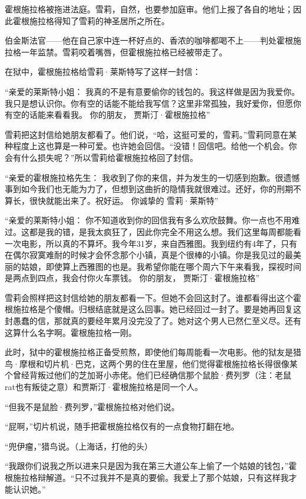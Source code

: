 霍根施拉格被拖进法庭。雪莉，自然，也要参加庭审。他们上报了各自的地址；因此霍根施拉格得知了雪莉的神圣居所之所在。

伯金斯法官——他在自己家中连一杯好点的、香浓的咖啡都喝不上——判处霍根施拉格一年监禁。雪莉咬着嘴唇，但霍根施拉格已经被带走了。

在狱中，霍根施拉格给雪莉·莱斯特写了这样一封信：

“亲爱的莱斯特小姐：
我真的不是有意要偷你的钱包的。我这样做是因为我爱你。我只是想认识你。你有空的话能不能给我写信？这里非常孤独，我好爱你，但愿你有空的话能来看看我。
你的朋友，
贾斯汀·霍根施拉格”

雪莉把这封信给她朋友都看了。他们说，“哈，这挺可爱的，雪莉。”雪莉同意在某种程度上这也算是一种可爱。也许她会回信。“没错！回信吧。给他一个机会。你会有什么损失呢？”所以雪莉给霍根施拉格回了封信。

“亲爱的霍根施拉格先生：
我收到了你的来信，并为发生的一切感到抱歉。很遗憾事到如今我们也无能为力了，但想到这曲折的隐情我就很难过。还好，你的刑期不算长，很快就能出来了。祝好运。
你诚挚的
雪莉·莱斯特”

“亲爱的莱斯特小姐：
你不知道收到你的回信我有多么欢欣鼓舞。你一点也不用难过。这都是我的错，是我太疯狂了，因此你完全不用这么想。我们这里每周都能看一次电影，所以真的不算坏。我今年31岁，来自西雅图。我到纽约有4年了，只有在偶尔寂寞难耐的时候才会怀念那个小镇，真是个很棒的小镇。你是我见过的最美丽的姑娘，即使算上西雅图的也是。我希望你能在哪个周六下午来看我，探视时间是两点到四点，我会付你火车票钱。
你的朋友，
贾斯汀·霍根施拉格”

雪莉会照样把这封信给她的朋友都看一下。但她不会回这封了。谁都看得出这个霍根施拉格是个傻帽。归根结底就是这么回事。她已经回过一封了。要是她再回复这封愚蠢的信，那就真的要经年累月没完没了了。她对这个男人已然仁至义尽。还有这算什么名字啊。霍根施拉格一刚。

此时，狱中的霍根施拉格正备受煎熬，即使他们每周能看一次电影。他的狱友是猎鸟·摩根和切片机·巴克，这两个男的住在里屋，他们觉得霍根施拉格长得很像某个曾经背叛过他们的芝加哥小赤佬。他们已经确信那个鼠脸·费列罗（注：老鼠rat也有叛徒之意）和贾斯汀·霍根施拉格是同一个人。

“但我不是鼠脸·费列罗，”霍根施拉格对他们说。

“屁啊，”切片机说，随手把霍根施拉格仅有的一点食物打翻在地。

“兜伊瘤，”猎鸟说。（上海话，打他的头）

“我跟你们说我之所以进来只是因为我在第三大道公车上偷了一个姑娘的钱包，”霍根施拉格辩解道。“只不过我并不是真的要偷。我爱上了那个姑娘，只有这样我才能认识她。”

